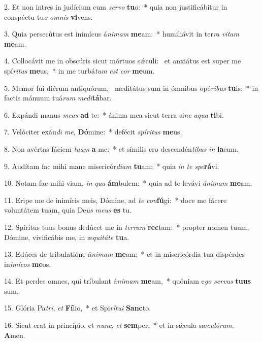 2. Et non intres in judícium cum \textit{ser}\textit{vo} \textbf{tu}o:~*  quia non justificábitur in conspéctu tu\textit{o} \textit{om}\textit{nis} \textbf{vi}vens.\

3. Quia persecútus est inimícus á\textit{ni}\textit{mam} \textbf{me}am:~*  humiliávit in ter\textit{ra} \textit{vi}\textit{tam} \textbf{me}am.\

4. Collocávit me in obscúris sicut mórtuos sǽculi: \dag\  et anxiátus est super me spí\textit{ri}\textit{tus} \textbf{me}us,~*  in me turbá\textit{tum} \textit{est} \textit{cor} \textbf{me}um.\

5. Memor fui diérum antiquórum, \dag\  meditátus sum in ómnibus opé\textit{ri}\textit{bus} \textbf{tu}is:~*  in factis mánuum tuá\textit{rum} \textit{me}\textit{di}\textbf{tá}bar.\

6. Expándi manus \textit{me}\textit{as} \textbf{ad} te:~*  ánima mea sicut terra si\textit{ne} \textit{a}\textit{qua} \textbf{ti}bi.\

7. Velóciter exáu\textit{di} \textit{me}, \textbf{Dó}mine:~*  defécit \textit{spí}\textit{ri}\textit{tus} \textbf{me}us.\

8. Non avértas fáciem \textit{tu}\textit{am} \textbf{a} me:~*  et símilis ero descendén\textit{ti}\textit{bus} \textit{in} \textbf{la}cum.\

9. Audítam fac mihi mane misericór\textit{di}\textit{am} \textbf{tu}am:~*  quia \textit{in} \textit{te} \textit{spe}\textbf{rá}vi.\

10. Notam fac mihi viam, \textit{in} \textit{qua} \textbf{ám}bulem:~*  quia ad te levávi \textit{á}\textit{ni}\textit{mam} \textbf{me}am.\

11. Eripe me de inimícis meis, Dómine, ad \textit{te} \textit{con}\textbf{fú}gi:~*  doce me fácere voluntátem tuam, quia De\textit{us} \textit{me}\textit{us} \textbf{es} tu.\

12. Spíritus tuus bonus dedúcet me in \textit{ter}\textit{ram} \textbf{rec}tam:~*  propter nomen tuum, Dómine, vivificábis me, in æ\textit{qui}\textit{tá}\textit{te} \textbf{tu}a.\

13. Edúces de tribulatióne á\textit{ni}\textit{mam} \textbf{me}am:~*  et in misericórdia tua dispérdes in\textit{i}\textit{mí}\textit{cos} \textbf{me}os.\

14. Et perdes omnes, qui tríbulant á\textit{ni}\textit{mam} \textbf{me}am,~*  quóniam e\textit{go} \textit{ser}\textit{vus} \textbf{tu}\textbf{us} sum.\

15. Glória Pa\textit{tri}, \textit{et} \textbf{Fí}lio,~*  et Spi\textit{rí}\textit{tu}\textit{i} \textbf{Sanc}to.\

16. Sicut erat in princípio, et \textit{nunc}, \textit{et} \textbf{sem}per,~*  et in sǽcula sæ\textit{cu}\textit{ló}\textit{rum}. \textbf{A}men.\


